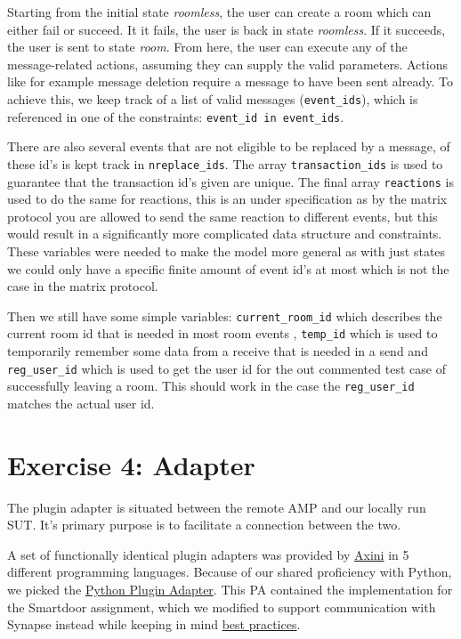 \documentclass[a4paper]{article}
\begin{document}
Starting from the initial state \textit{roomless}, the user can create a room which can either fail or succeed. It it fails, the user is back in state \textit{roomless}. If it succeeds, the user is sent to state \textit{room}. From here, the user can execute any of the message-related actions, assuming they can supply the valid parameters. Actions like for example message deletion require a message to have been sent already. To achieve this, we keep track of a list of valid messages (\verb`event_ids`), which is referenced in one of the constraints: \verb`event_id in event_ids`.

There are also several events that are not eligible to be replaced by a message, of these id's is kept track in \verb`nreplace_ids`. The array \verb`transaction_ids` is used to guarantee that the transaction id's given are unique. The final array \verb`reactions` is used to do the same for reactions, this is an under specification as by the matrix protocol you are allowed to send the same reaction to different events, but this would result in a significantly more complicated data structure and constraints. These variables were needed to make the model more general as with just states we could only have a specific finite amount of event id's at most which is not the case in the matrix protocol. 

Then we still have some simple variables: \verb`current_room_id` which describes the current room id that is needed in most room events , \verb`temp_id` which is used to temporarily remember some data from a receive that is needed in a send and \verb`reg_user_id` which is used to get the user id for the out commented test case of successfully leaving a room. This should work in the case the \verb`reg_user_id` matches the actual user id.

\section{Exercise 4: Adapter} \label{exercise-4-adapter}
The plugin adapter is situated between the remote AMP and our locally run SUT. It's primary purpose is to facilitate a connection between the two. 

A set of functionally identical plugin adapters was provided by \href{https://github.com/Axini}{Axini} in 5 different programming languages. Because of our shared proficiency with Python, we picked the \href{https://github.com/Axini/smartdoor-adapter-python}{Python Plugin Adapter}. This PA contained the implementation for the Smartdoor assignment, which we modified to support communication with Synapse instead while keeping in mind \href{https://course02.axini.com/docs/tech/adapters/adapter\_best\_practices.html}{best practices}.
\end{document}
